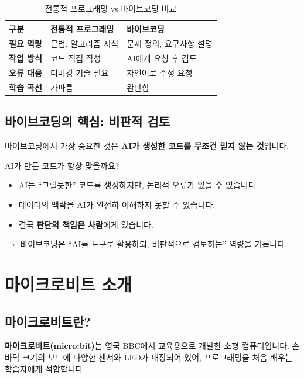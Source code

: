 \documentclass[11pt, a4paper]{article}
\begin{document}
\begin{table}[H]
\centering
\begin{tabularx}{\textwidth}{>{\bfseries}l X X}
\toprule
구분 & 전통적 프로그래밍 & 바이브코딩 \\
\midrule
필요 역량 & 문법, 알고리즘 지식 & 문제 정의, 요구사항 설명 \\
작업 방식 & 코드 직접 작성 & AI에게 요청 후 검토 \\
오류 대응 & 디버깅 기술 필요 & 자연어로 수정 요청 \\
학습 곡선 & 가파름 & 완만함 \\
\bottomrule
\end{tabularx}
\caption{전통적 프로그래밍 vs 바이브코딩 비교}
\end{table}

\subsection{바이브코딩의 핵심: 비판적 검토}

바이브코딩에서 가장 중요한 것은 \textbf{AI가 생성한 코드를 무조건 믿지 않는 것}입니다.

\begin{think}
AI가 만든 코드가 항상 맞을까요?

\begin{itemize}
    \item AI는 ``그럴듯한'' 코드를 생성하지만, 논리적 오류가 있을 수 있습니다.
    \item 데이터의 맥락을 AI가 완전히 이해하지 못할 수 있습니다.
    \item 결국 \textbf{판단의 책임은 사람}에게 있습니다.
\end{itemize}

$\rightarrow$ 바이브코딩은 ``AI를 도구로 활용하되, 비판적으로 검토하는'' 역량을 기릅니다.
\end{think}

\section{마이크로비트 소개}

\subsection{마이크로비트란?}

\textbf{마이크로비트(micro:bit)}는 영국 BBC에서 교육용으로 개발한 소형 컴퓨터입니다. 손바닥 크기의 보드에 다양한 센서와 LED가 내장되어 있어, 프로그래밍을 처음 배우는 학습자에게 적합합니다.
\end{document}
